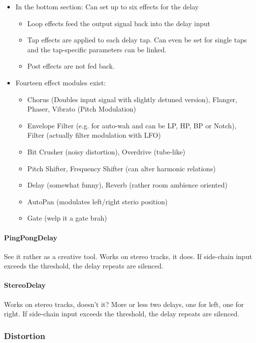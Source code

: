 \documentclass[10pt]{article}
\begin{document}
\begin{itemize}
\begin{itemize}
\begin{itemize}
		\end{itemize}
	\end{itemize}
	\item In the bottom section: Can set up to six effects for the delay
	\begin{itemize}
		\item Loop effects feed the output signal back into the delay input
		\item Tap effects are applied to each delay tap. Can even be set for single taps and the tap-specific parameters can be linked.
		\item Post effects are not fed back.
	\end{itemize}
	\item Fourteen effect modules exist:
	\begin{itemize}
		\item Chorus (Doubles input signal with slightly detuned version), Flanger, Phaser, Vibrato (Pitch Modulation)
		\item  Envelope Filter (e.g. for auto-wah and can be LP, HP, BP or Notch), Filter (actually filter modulation with LFO)
		\item Bit Crusher (noisy distortion), Overdrive (tube-like)
		\item Pitch Shifter, Frequency Shifter (can alter harmonic relations)
		\item Delay (somewhat funny), Reverb (rather room ambience oriented)
		\item AutoPan (modulates left/right sterio position)
		\item Gate (welp it a gate brah)
	\end{itemize}
\end{itemize}

\paragraph{PingPongDelay} See it rather as a creative tool. Works on stereo tracks, it does. If side-chain input exceeds the threshold, the delay repeats are silenced.

\paragraph{StereoDelay} Works on stereo tracks, doesn't it? More or less two delays, one for left, one for right. If side-chain input exceeds the threshold, the delay repeats are silenced.

\subsubsection{Distortion}
\end{document}
